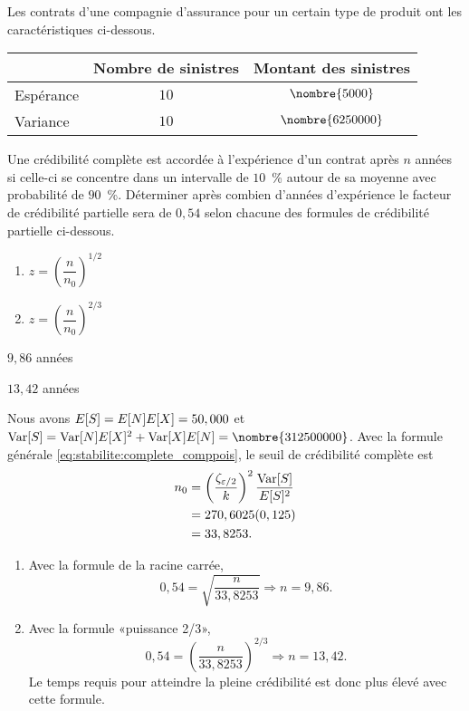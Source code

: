 \begin{exercice}
  Les contrats d'une compagnie d'assurance pour un certain type de
  produit ont les caractéristiques ci-dessous.
  \begin{center}
    \begin{tabular}{lcc}
      \toprule
      & Nombre de sinistres & Montant des sinistres \\
      \midrule
      Espérance & $10$ & $\nombre{5000}$ \\
      Variance  & $10$ & $\nombre{6250000}$ \\
      \bottomrule
    \end{tabular}
  \end{center}
  Une crédibilité complète est accordée à l'expérience d'un contrat
  après $n$ années si celle-ci se concentre dans un intervalle de
  $10$~\% autour de sa moyenne avec probabilité de $90$~\%. Déterminer
  après combien d'années d'expérience le facteur de crédibilité
  partielle sera de $0,54$ selon chacune des formules de crédibilité
  partielle ci-dessous.
  \begin{enumerate}
  \item $z = \left( \dfrac{n}{n_0} \right)^{1/2}$
  \item $z = \left( \dfrac{n}{n_0} \right)^{2/3}$
  \end{enumerate}
  \begin{rep}
    \begin{inparaenum}
    \item $9,86$ années
    \item $13,42$ années
    \end{inparaenum}
  \end{rep}
  \begin{sol}
    Nous avons $E [ S ] = E [ N ] E [ X ] = 50,000$ et
    $\var{S} = \var{N} \esp{X}^2 + \var{X} \esp{N} =
    \nombre{312500000}$. Avec la formule générale
    \eqref{eq:stabilite:complete_comppois}, le seuil de crédibilité
    complète est
    \begin{align*}
      n_0
      &= \left( \frac{\zeta_{\varepsilon/2}}{k} \right)^2
      \frac{\operatorname{Var} [ S ]}{E [ S ]^2} \\
      &= 270,6025 (0,125) \\
      &= 33,8253.
    \end{align*}
    \begin{enumerate}
    \item Avec la formule de la racine carrée,
      \begin{equation*}
        0,54 = \sqrt{\frac{n}{33,8253}} \Rightarrow n = 9,86.
      \end{equation*}
    \item Avec la formule «puissance 2/3»,
      \begin{equation*}
        0,54 = \left( \frac{n}{33,8253} \right)^{2/3} \Rightarrow n = 13,42.
      \end{equation*}
      Le temps requis pour atteindre la pleine crédibilité est donc
      plus élevé avec cette formule.
    \end{enumerate}
  \end{sol}
\end{exercice}


